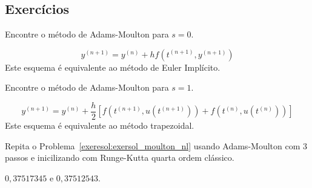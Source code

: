 \subsection*{Exercícios}

\begin{exer}
Encontre o método de Adams-Moulton para $s=0$.
\end{exer}
\begin{resp}
 \begin{equation}
  y^{(n+1)}=y^{(n)}+hf\left(t^{(n+1)},y^{(n+1)}\right)
 \end{equation}
Este esquema é equivalente ao método de Euler Implícito.
 \end{resp}



\begin{exer}
Encontre o método de Adams-Moulton para $s=1$.
\end{exer}
\begin{resp}
 \begin{equation}
  y^{(n+1)}=y^{(n)}+\frac{h}{2}\left[f\left(t^{(n+1)},u(t^{(n+1)})\right)+f\left(t^{(n)},u(t^{(n)})\right)\right]
 \end{equation}
 Este esquema é equivalente ao método trapezoidal.
 \end{resp}


 \begin{exer} Repita o Problema~\ref{exeresol:exersol_moulton_nl} usando Adams-Moulton com 3 passos e inicilizando com Runge-Kutta quarta ordem clássico.
  \end{exer}
\begin{resp}
 $0,37517345$ e  $0,37512543$.
\end{resp}



